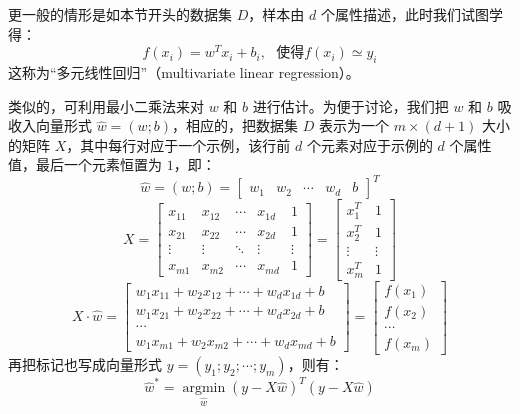 \documentclass[12pt, a4paper]{article} %
\begin{document}
更一般的情形是如本节开头的数据集 $D$，样本由 $d$ 个属性描述，此时我们试图学得：
\begin{equation*}
    f(x_i) = w^T x_i + b_i, \ \ \ \text{使得} f(x_i) \simeq y_i
\end{equation*}
这称为“多元线性回归”（multivariate linear regression）。

类似的，可利用最小二乘法来对 $w$ 和 $b$ 进行估计。为便于讨论，我们把 $w$ 和 $b$ 吸收入向量形式 $\hat{w} = (w; b)$，相应的，把数据集 $D$ 表示为一个 $m \times (d + 1)$ 大小的矩阵 $X$，其中每行对应于一个示例，该行前 $d$ 个元素对应于示例的 $d$ 个属性值，最后一个元素恒置为 $1$，即：
\begin{equation*}
    \hat w = (w;b) = {\left[ {\begin{array}{*{20}{c}}
        {{w_1}}&{{w_2}}& \cdots &{{w_d}}&b
    \end{array}} \right]^T}
\end{equation*}
\begin{equation*}
    X = \left[ {\begin{array}{*{20}{c}}
        {{x_{11}}}&{{x_{12}}}& \cdots &{{x_{1d}}}&1\\
        {{x_{21}}}&{{x_{22}}}& \cdots &{{x_{2d}}}&1\\
         \vdots & \vdots & \ddots & \vdots & \vdots \\
        {{x_{m1}}}&{{x_{m2}}}& \cdots &{{x_{md}}}&1
        \end{array}} \right] = \left[ {\begin{array}{*{20}{c}}
        {x_1^T}&1\\
        {x_2^T}&1\\
         \vdots & \vdots \\
        {x_m^T}&1
    \end{array}} \right]
\end{equation*}
\begin{equation*}
    X \cdot \hat w = \left[ {\begin{array}{*{20}{c}}
        {{w_1}{x_{11}} + {w_2}{x_{12}} +  \cdots  + {w_d}{x_{1d}} + b}\\
        {{w_1}{x_{21}} + {w_2}{x_{22}} +  \cdots  + {w_d}{x_{2d}} + b}\\
         \cdots \\
        {{w_1}{x_{m1}} + {w_2}{x_{m2}} +  \cdots  + {w_d}{x_{md}} + b}
        \end{array}} \right] = \left[ {\begin{array}{*{20}{c}}
        {f\left( {{x_1}} \right)}\\
        {f\left( {{x_2}} \right)}\\
         \cdots \\
        {f\left( {{x_m}} \right)}
    \end{array}} \right]
\end{equation*}
再把标记也写成向量形式 $y = (y_1; y_2; \cdots; y_m)$，则有：
\begin{equation*}
    \hat{w}^* = \mathop {\arg \min }\limits_{\hat w} {\left( {y - X\hat w} \right)^T}\left( {y - X\hat w} \right)
\end{equation*}
\end{document}
